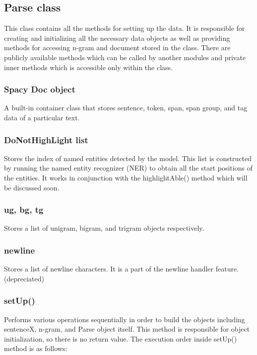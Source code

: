 \documentclass[12pt,oneside,openright,a4paper]{cpe-english-project}
\begin{document}
\subsection{ Parse class}
This class contains all the methods for setting up the data. It is responsible for creating and initializing all the necessary data objects as well as providing methods for accessing n-gram and document stored in the class. There are publicly available methods which can be called by another modules and private inner methods which is accessible only within the class.
\subsubsection{Spacy Doc object }
A built-in container class that stores sentence, token, span, span group, and tag data of a particular text. 

\subsubsection{DoNotHighLight list }
Stores the index of named entities detected by the model. This list is constructed by running the named entity recognizer (NER) to obtain all the start positions of the entities. It works in conjunction with the highlightAble() method which will be discussed soon.

\subsubsection{ ug, bg, tg}
Stores a list of unigram, bigram, and trigram objects respectively.

\subsubsection{newline}
Stores a list of newline characters. It is a part of the newline handler feature. (depreciated)

\subsubsection { setUp()} 
Performs various operations sequentially in order to build the objects including sentenceX, n-gram, and Parse object itself. This method is responsible for object initialization, so there is no return value. The execution order inside setUp() method is as follows:
\end{document}
